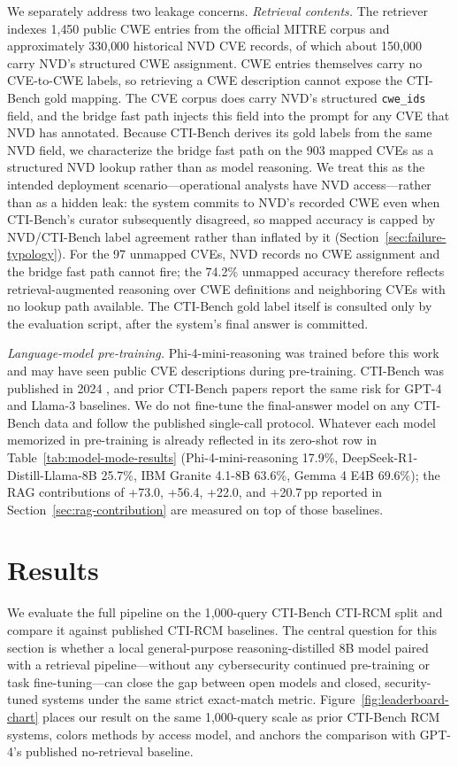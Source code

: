 We separately address two leakage concerns. \emph{Retrieval contents.} The retriever indexes 1{,}450 public CWE entries from the official MITRE corpus and approximately 330{,}000 historical NVD CVE records, of which about 150{,}000 carry NVD's structured CWE assignment. CWE entries themselves carry no CVE-to-CWE labels, so retrieving a CWE description cannot expose the CTI-Bench gold mapping. The CVE corpus does carry NVD's structured \texttt{cwe\_ids} field, and the bridge fast path injects this field into the prompt for any CVE that NVD has annotated. Because CTI-Bench derives its gold labels from the same NVD field, we characterize the bridge fast path on the 903 mapped CVEs as a structured NVD lookup rather than as model reasoning. We treat this as the intended deployment scenario---operational analysts have NVD access---rather than as a hidden leak: the system commits to NVD's recorded CWE even when CTI-Bench's curator subsequently disagreed, so mapped accuracy is capped by NVD/CTI-Bench label agreement rather than inflated by it (Section~\ref{sec:failure-typology}). For the 97 unmapped CVEs, NVD records no CWE assignment and the bridge fast path cannot fire; the 74.2\% unmapped accuracy therefore reflects retrieval-augmented reasoning over CWE definitions and neighboring CVEs with no lookup path available. The CTI-Bench gold label itself is consulted only by the evaluation script, after the system's final answer is committed.

\emph{Language-model pre-training.} Phi-4-mini-reasoning was trained before this work and may have seen public CVE descriptions during pre-training. CTI-Bench was published in 2024 \cite{alam-2024}, and prior CTI-Bench papers report the same risk for GPT-4 and Llama-3 baselines. We do not fine-tune the final-answer model on any CTI-Bench data and follow the published single-call protocol. Whatever each model memorized in pre-training is already reflected in its zero-shot row in Table~\ref{tab:model-mode-results} (Phi-4-mini-reasoning 17.9\%, DeepSeek-R1-Distill-Llama-8B 25.7\%, IBM Granite 4.1-8B 63.6\%, Gemma 4 E4B 69.6\%); the RAG contributions of +73.0, +56.4, +22.0, and +20.7\,pp reported in Section~\ref{sec:rag-contribution} are measured on top of those baselines.

\section{Results}
\label{sec:results}

We evaluate the full pipeline on the 1{,}000-query CTI-Bench CTI-RCM split and compare it against published CTI-RCM baselines. The central question for this section is whether a local general-purpose reasoning-distilled 8B model paired with a retrieval pipeline---without any cybersecurity continued pre-training or task fine-tuning---can close the gap between open models and closed, security-tuned systems under the same strict exact-match metric. Figure~\ref{fig:leaderboard-chart} places our result on the same 1{,}000-query scale as prior CTI-Bench RCM systems, colors methods by access model, and anchors the comparison with GPT-4's published no-retrieval baseline.

